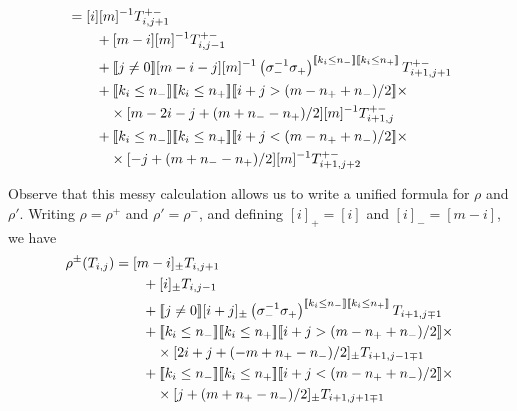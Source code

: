 \documentclass[12pt]{article}
\begin{document}
\begin{align*}
& = 
[i][m]^{-1} T^{+-}_{i,j+1} \\
& \qquad +
[m-i][m]^{-1} T^{+-}_{i, j-1} \\
& \qquad +
\truth{j \neq 0} [m-i-j][m]^{-1} \left(\sigma_-^{-1} \sigma_+\right)^{\truth{k_i \leq n_-} \truth{k_i \leq n_+}} T^{+-}_{i+1, j+1} \\
& \qquad +
\truth{k_i \leq n_-} \truth{k_i \leq n_+}
\truth{i+j > (m - n_+ + n_-)/2} \times \\
& \qquad \quad \times  [m-2i-j+ (m + n_- - n_+)/2 ][m]^{-1} T^{+-}_{i+1,j} \\
& \qquad +
\truth{k_i \leq n_-} \truth{k_i \leq n_+}
\truth{i+j < (m - n_+ + n_-)/2} \times \\
& \qquad \quad \times [-j + (m + n_- - n_+)/2][m]^{-1} T^{+-}_{i+1,j+2} 
\end{align*}

Observe that this messy calculation allows us to write a unified formula for $\rho$ and $\rho'$.
Writing $\rho = \rho^+$ and $\rho' = \rho^-$, and defining $[i]_+ = [i]$ and $[i]_- = [m-i]$, we have
\begin{align*}
[m] \rho^{\pm}(T_{i,j}) & = 
[m-i]_\pm T_{i,j+1} \\
& \qquad +
[i]_\pm T_{i, j-1} \\
& \qquad +
\truth{j \neq 0} [i+j]_\pm \left(\sigma_-^{-1} \sigma_+\right)^{\truth{k_i \leq n_-} \truth{k_i \leq n_+}} T_{i+1, j\mp1} \\
& \qquad +
\truth{k_i \leq n_-} \truth{k_i \leq n_+}
\truth{i+j > (m - n_+ + n_-)/2} \times \\
& \qquad \quad \times  [2i+j+ (-m + n_+ - n_-)/2 ]_\pm  T_{i+1,j-1\mp1} \\
& \qquad +
\truth{k_i \leq n_-} \truth{k_i \leq n_+}
\truth{i+j < (m - n_+ + n_-)/2} \times \\
& \qquad \quad \times [j + (m + n_+ - n_-)/2]_\pm  T_{i+1,j+1\mp1} 
\end{align*}
\end{document}
